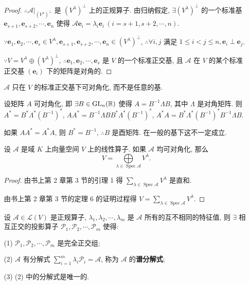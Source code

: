 \documentclass{ctexart}
\begin{document}
\begin{proof}
    $\therefore\mathcal{A}|_{(V^\lambda)^\perp}$ 是 $(V^\lambda)^\perp$ 上的正规算子. 由归纳假定, $\exists(V^\lambda)^\perp$ 的一个标准基 $\boldsymbol{e}_{s+1},\boldsymbol{e}_{s+2},\cdots,\boldsymbol{e}_n$ 使得 $\mathcal{A}\boldsymbol{e}_i=\lambda_i\boldsymbol{e}_i\ (i=s+1,s+2,\cdots,n)$.

    $\because\boldsymbol{e}_1,\boldsymbol{e}_2,\cdots,\boldsymbol{e}_s\in V^\lambda,\boldsymbol{e}_{s+1},\boldsymbol{e}_{s+2},\cdots,\boldsymbol{e}_n\in(V^\lambda)^\perp$, $\therefore\forall i,j$ 满足 $1\leq i<j\leq n,\boldsymbol{e}_i\perp\boldsymbol{e}_j$.

    $\because V=V^\lambda\oplus(V^\lambda)^\perp$, $\therefore\boldsymbol{e}_1,\boldsymbol{e}_2,\cdots,\boldsymbol{e}_s$ 是 $V$ 的一个标准正交基, 且 $\mathcal{A}$ 在 $V$ 的某个标准正交基 $(\boldsymbol{e}_i)$ 下的矩阵是对角的.
\end{proof}
\begin{note}
    $\mathcal{A}$ 只在 $V$ 的标准正交基下可对角化, 而不是任意的基.

    设矩阵 $A$ 可对角化, 即 $\exists B\in\operatorname{GL} _n(\mathbb{R})$ 使得 $A=B^{-1}\Lambda B$, 其中 $\Lambda$ 是对角矩阵. 则 $A^*=B^*\Lambda^*(B^{-1})^*$, $AA^*=B^{-1}\Lambda BB^*\Lambda^*(B^{-1})^*$, $A^*A=B^*\Lambda^*(B^{-1})^*B^{-1}\Lambda B$.

    如果 $AA^*=A^*A$, 则 $B^*=B^{-1}$, $\therefore B$ 是酉矩阵. 在一般的基下这不一定成立.
\end{note}
\begin{lemma}\label{l3.4}
    设 $\mathcal{A}$ 是域 $K$ 上向量空间 $V$ 上的线性算子. 如果 $\mathcal{A}$ 均可对角化, 那么
    \[V=\bigoplus\limits_{\lambda\in\operatorname{Spec}\mathcal{A}}V^\lambda.\]
\end{lemma}
\begin{proof}
    由书上第 2 章第 3 节的引理 1 得 $\sum\limits_{\lambda\in\operatorname{Spec}\mathcal{A}}V^\lambda$ 是直和.

    由书上第 2 章第 3 节的定理 6 的证明过程得 $V=\sum\limits_{\lambda\in\operatorname{Spec}\mathcal{A}}V^\lambda$.
\end{proof}
\begin{theorem}\label{t3.8}
    设 $\mathcal{A}\in\mathcal{L}(V)$ 是正规算子, $\lambda_1,\lambda_2,\cdots,\lambda_m$ 是 $\mathcal{A}$ 所有的互不相同的特征值, 则 $\exists$ 相互正交的投影算子 $\mathcal{P}_1,\mathcal{P}_2,\cdots,\mathcal{P}_m$ 使得:

    (1) $\mathcal{P}_1,\mathcal{P}_2,\cdots,\mathcal{P}_m$ 是完全正交组;

    (2) $\mathcal{A}$ 有分解式 $\sum\limits_{i=1}^m\lambda_i\mathcal{P}_i=\mathcal{A}$, 称为 $\mathcal{A}$ 的\textbf{谱分解式};

    (3) (2) 中的分解式是唯一的.
\end{theorem}
\end{document}

